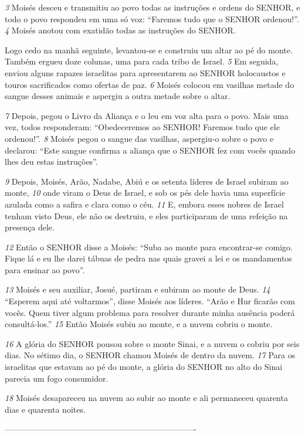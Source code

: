 \smallskip
\textit{\tiny 3} 
Moisés desceu e transmitiu ao povo todas as instruções e ordens do SENHOR, e
todo o povo respondeu em uma só voz: “Faremos tudo que o SENHOR ordenou!”. 
\smallskip
\textit{\tiny 4} 
Moisés anotou com exatidão todas as instruções do SENHOR. 

\smallskip
Logo cedo na
manhã seguinte, levantou-se e construiu um altar ao pé do monte. Também
ergueu doze colunas, uma para cada tribo de Israel. 
\textit{\tiny 5} 
Em seguida, enviou alguns
rapazes israelitas para apresentarem ao SENHOR holocaustos e touros sacrificados
como ofertas de paz. 
\textit{\tiny 6} 
Moisés colocou em vasilhas metade do sangue desses
animais e aspergiu a outra metade sobre o altar. 


\smallskip
\textit{\tiny 7} 
Depois, pegou o Livro da Aliança e o leu em voz alta para o povo. Mais uma vez,
todos responderam: “Obedeceremos ao SENHOR! Faremos tudo que ele ordenou!”. 
\textit{\tiny 8} 
Moisés pegou o sangue das vasilhas, aspergiu-o sobre o povo e declarou: “Este
sangue confirma a aliança que o SENHOR fez com vocês quando lhes deu estas
instruções”. 

\smallskip
\textit{\tiny 9} 
Depois, Moisés, Arão, Nadabe, Abiú e os setenta líderes de Israel subiram ao
monte, 
\textit{\tiny 10}
onde viram o Deus de Israel, e sob os pés dele havia uma superfície
azulada como a safira e clara como o céu. 
\textit{\tiny 11}
E, embora esses nobres de Israel
tenham visto Deus, ele não os destruiu, e eles participaram de uma refeição na
presença dele.
   
\smallskip
\textit{\tiny 12}
Então o SENHOR disse a Moisés: “Suba ao monte para encontrar-se comigo.
Fique lá e eu lhe darei tábuas de pedra nas quais gravei a lei e os mandamentos
para ensinar ao povo”. 

\smallskip
\textit{\tiny 13}
Moisés e seu auxiliar, Josué, partiram e subiram ao
monte de Deus.    
\textit{\tiny 14}
“Esperem aqui até voltarmos”, disse Moisés aos líderes. “Arão e Hur ficarão
com vocês. Quem tiver algum problema para resolver durante minha ausência
poderá consultá-los.”
\textit{\tiny 15}
Então Moisés subiu ao monte, e a nuvem cobriu o monte. 

\smallskip
\textit{\tiny 16}
A glória do
SENHOR pousou sobre o monte Sinai, e a nuvem o cobriu por seis dias. No sétimo
dia, o SENHOR chamou Moisés de dentro da nuvem. 
\textit{\tiny 17}
Para os israelitas que
estavam ao pé do monte, a glória do SENHOR no alto do Sinai parecia um fogo
consumidor. 

\smallskip
\textit{\tiny 18}
Moisés desapareceu na nuvem ao subir ao monte e ali
permaneceu quarenta dias e quarenta noites.



----------------------------------------------------------------------
